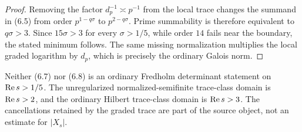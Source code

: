 \begin{proof}
Removing the factor \(d_p^{-1}\asymp p^{-1}\) from the local trace changes
the summand in (6.5) from order \(p^{1-q\sigma}\) to
\(p^{2-q\sigma}\).  Prime summability is therefore equivalent to
\(q\sigma>3\).  Since \(15\sigma>3\) for every \(\sigma>1/5\), while order
\(14\) fails near the boundary, the stated minimum follows.  The same
missing normalization multiplies the local graded logarithm by \(d_p\),
which is precisely the ordinary Galois norm.
\end{proof}

\begin{remark}
Neither (6.7) nor (6.8) is an ordinary Fredholm determinant statement on
\(\operatorname{Re} s>1/5\).  The unregularized normalized-semifinite trace-class
domain is \(\operatorname{Re} s>2\), and the ordinary Hilbert trace-class domain is
\(\operatorname{Re} s>3\).  The cancellations retained by the graded trace are part of
the source object, not an estimate for \(|X_s|\).
\end{remark}
